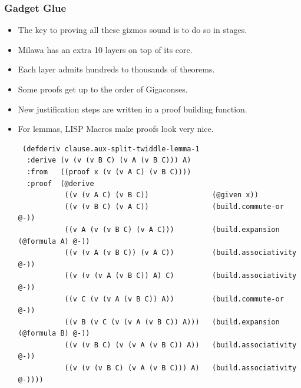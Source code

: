\documentclass[10pt]{beamer}
\begin{document}
\begin{frame}[fragile]
\frametitle{Gadget Glue}
\begin{itemize}
 \item The key to proving all these gizmos sound is to do so in stages. 
 \item Milawa has an extra 10 layers on top of its core.
 \item Each layer admits hundreds to thousands of theorems.
 \item Some proofs get up to the order of Gigaconses.
\pause
 \item New justification steps are written in a proof building function.
\pause
 \item For lemmas, LISP Macros make proofs look very nice.
{\tiny
\begin{lstlisting}
 (defderiv clause.aux-split-twiddle-lemma-1
  :derive (v (v (v B C) (v A (v B C))) A)
  :from   ((proof x (v (v A C) (v B C))))
  :proof  (@derive
           ((v (v A C) (v B C))               (@given x))
           ((v (v B C) (v A C))               (build.commute-or @-))
           ((v A (v (v B C) (v A C)))         (build.expansion (@formula A) @-))
           ((v (v A (v B C)) (v A C))         (build.associativity @-))
           ((v (v (v A (v B C)) A) C)         (build.associativity @-))
           ((v C (v (v A (v B C)) A))         (build.commute-or @-))
           ((v B (v C (v (v A (v B C)) A)))   (build.expansion (@formula B) @-))
           ((v (v B C) (v (v A (v B C)) A))   (build.associativity @-))
           ((v (v (v B C) (v A (v B C))) A)   (build.associativity @-))))
\end{lstlisting}}
\end{itemize}
\end{frame}

\end{document}
